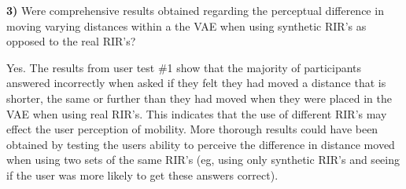 \documentclass[../../main.tex]{subfiles}
\begin{document}



			\textbf{3)} Were comprehensive results obtained regarding the perceptual difference in moving varying distances within a the \ac{VAE} when using synthetic \ac{RIR}'s as opposed to the real \ac{RIR}'s?

				Yes. The results from user test \#1 show that the majority of participants answered incorrectly when asked if they felt they had moved a distance that is shorter, the same or further than they had moved when they were placed in the \ac{VAE} when using real \ac{RIR}'s. This indicates that the use of different \ac{RIR}'s may effect the user perception of mobility. More thorough results could have been obtained by testing the users ability to perceive the difference in distance moved when using two sets of the same \ac{RIR}'s (eg, using only synthetic \ac{RIR}'s and seeing if the user was more likely to get these answers correct).


\end{document}
